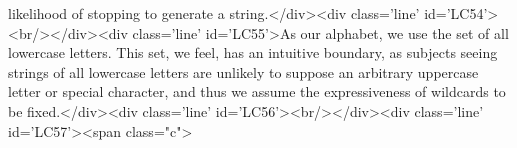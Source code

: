 likelihood of stopping to generate a string.</div><div class='line' id='LC54'><br/></div><div class='line' id='LC55'>As our alphabet, we use the set of all lowercase letters. This set, we feel, has an intuitive boundary, as subjects seeing strings of all lowercase letters are unlikely to suppose an arbitrary uppercase letter or special character, and thus we assume the expressiveness of wildcards to be fixed.</div><div class='line' id='LC56'><br/></div><div class='line' id='LC57'><span class="c">%